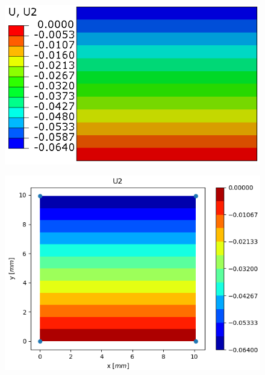 \documentclass[11pt]{article}
\begin{document}
\begin{figure}[H]
	\centering
	\begin{minipage}{.5\textwidth}
		\centering
		\includegraphics[width=1\linewidth]{M1U2.png}
		\label{M1U2}
	\end{minipage}%
	\begin{minipage}{.5\textwidth}
		\centering
		\includegraphics[width=1\linewidth]{M1U2_IGA.png}
		\label{M1U2_IGA}
	\end{minipage}
\end{figure}
\end{document}
